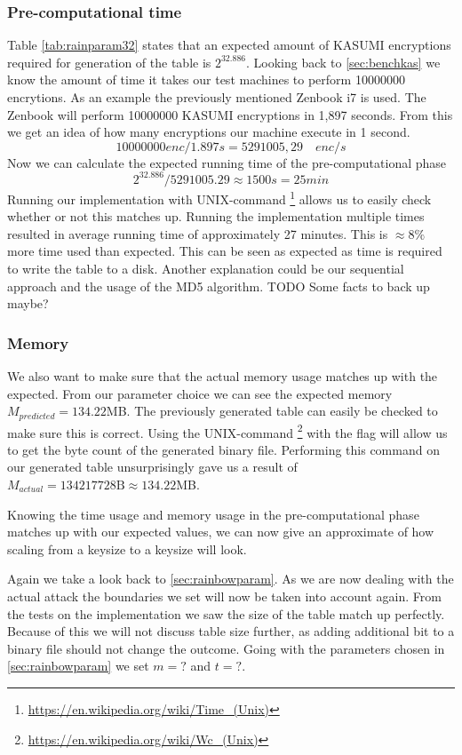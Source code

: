 \subsubsection*{Pre-computational time}
Table \ref{tab:rainparam32} states that an expected amount of
KASUMI encryptions required for generation of the table is
$2^{32.886}$. Looking back to \ref{sec:benchkas} we know the
amount of time it takes our test machines to perform 10000000 encrytions. As an
example the previously mentioned Zenbook i7 is used. The
Zenbook will perform 10000000 KASUMI encryptions in 1,897
seconds. From this we get an idea of how many encryptions our
machine execute in 1 second.
\[10000000 enc / 1.897 s = 5291005,29 \quad enc/s\]
Now we can calculate the expected running time of the
pre-computational phase
\[2^{32.886} / 5291005.29 \approx 1500s = 25 min \]
Running our implementation with UNIX-command
\footnote{\url{https://en.wikipedia.org/wiki/Time_(Unix)}}
allows us to easily check whether or not this matches up. Running the
implementation multiple times resulted in average running time of
approximately 27 minutes. This is $\approx8\%$ more time used than
expected. This can be seen as expected as time is required to write
the table to a disk. Another explanation could be our sequential
approach and the usage of the MD5 algorithm. TODO Some facts to back up maybe?
\subsubsection*{Memory}
We also want to make sure that the actual memory usage matches up with
the expected. From our parameter choice we can see the expected memory
$M_{predicted}=134.22$MB. The previously generated table can easily be
checked to make sure this is correct. Using the UNIX-command
\footnote{\url{https://en.wikipedia.org/wiki/Wc_(Unix)}} with
the  flag will allow us to get the byte count of the
generated binary file. Performing this command on our generated table
unsurprisingly gave us a result of
$M_{actual}=134217728\text{B}\approx134.22$MB.

Knowing the time usage and memory usage in the pre-computational phase
matches up with our expected values, we can now give an approximate of
how scaling from a  keysize to a  keysize
will look.

Again we take a look back to \ref{sec:rainbowparam}. As we are now
dealing with the actual  attack the boundaries we set
will now be taken into account again. From the tests on the
 implementation we saw the size of the table match up
perfectly. Because of this we will not discuss table size further, as
adding additional bit to a binary file should not change the outcome.
Going with the parameters chosen in \ref{sec:rainbowparam} we set
$m=?$ and $t=?$.
